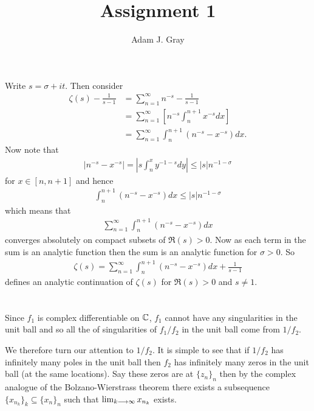 \documentclass{unswmaths}
\begin{document}
\author{Adam J. Gray}
\title{Assignment 1}
\subject{Complex Analysis}

\newcommand{\llra}{\Leftrightarrow}

\unswtitle

\section{}

Write $ s = \sigma + it $.  Then consider
\begin{align*}
    \zeta(s) - \frac{1}{s-1} &= \sum_{n=1}^\infty n^{-s} - \frac{1}{s-1} \\
        &= \sum_{n=1}^\infty \left[ n^{-s} \int_{n}^{n+1} x^{-s} dx \right] \\
        &= \sum_{n=1}^\infty \int_n^{n+1} (n^{-s} - x^{-s})dx.
\end{align*}
Now note that 
\begin{align*}
    |n^{-s} - x^{-s}| = \left| s \int_{n}^{x} y^{-1-s}dy \right| \leq |s|n^{-1-\sigma}
\end{align*}
for $ x \in [n, n+1] $
and hence
\begin{align*}
   \int_n^{n+1} (n^{-s} - x^{-s}) dx \leq |s|n^{-1-\sigma}  
\end{align*}
which means that
\begin{align*}
     \sum_{n=1}^\infty \int_n^{n+1} (n^{-s} - x^{-s})dx
\end{align*}
converges absolutely on compact subsets of $ \Re(s) > 0 $.
Now as each term in the sum is an analytic function then the sum is an analytic function for $ \sigma > 0 $. 
So
\begin{align*}
    \zeta(s) = \sum_{n=1}^\infty \int_{n}^{n+1}(n^{-s} - x^{-s})dx + \frac{1}{s-1} 
\end{align*}
defines an analytic continuation of $ \zeta(s) $ for $ \Re(s) > 0 $ and $ s \neq 1 $.
\section{}
Since $ f_1 $ is complex differentiable on $ \mathbb{C} $, $ f_1 $ cannot have any singularities in the unit ball and so all the of singularities of $f_1 / f_2 $ in the unit ball come from $ 1/ f_2 $. 

We therefore turn our attention to $ 1 / f_2 $. It is simple to see that if $ 1/f_2 $ has infinitely many poles in the unit ball then $ f_2 $ has infinitely many zeros in the unit ball (at the same locations). Say these zeros are at $ \{ z_n \}_n $ then by the complex analogue of the Bolzano-Wierstrass theorem there exists a subsequence $ \{ x_{n_k} \}_k \subseteq \{ x_n \}_n $ such that $ \lim_{k\longrightarrow\infty} x_{n_k} $ exists. 
\end{document}
